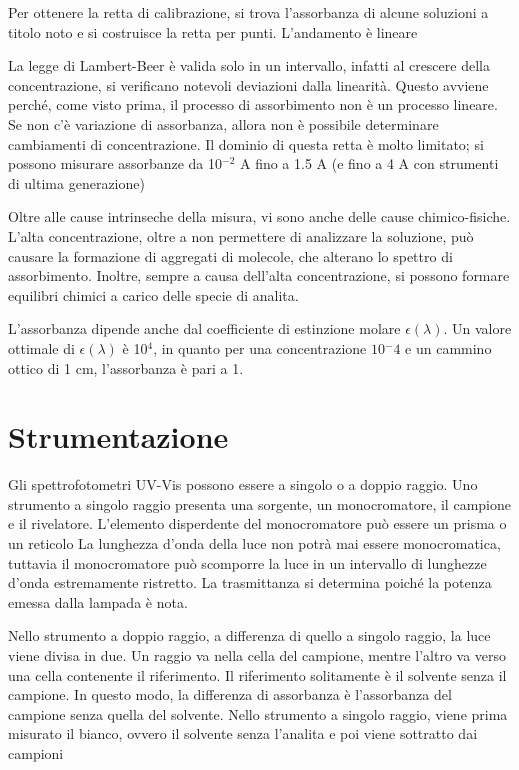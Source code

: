Per ottenere la retta di calibrazione, si trova l'assorbanza di alcune soluzioni a titolo noto e si costruisce la retta per punti. L'andamento è lineare

La legge di Lambert-Beer è valida solo in un intervallo, infatti al crescere della concentrazione, si verificano notevoli deviazioni dalla linearità.
Questo avviene perché, come visto prima, il processo di assorbimento non è un processo lineare.
Se non c'è variazione di assorbanza, allora non è possibile determinare cambiamenti di concentrazione.
Il dominio di questa retta è molto limitato; si possono misurare assorbanze da 10$^{-2}$ A fino a 1.5 A (e fino a 4 A con strumenti di ultima generazione)

Oltre alle cause intrinseche della misura, vi sono anche delle cause chimico-fisiche.
L'alta concentrazione, oltre a non permettere di analizzare la soluzione, può causare la formazione di aggregati di molecole, che alterano lo spettro di assorbimento.
Inoltre, sempre a causa dell'alta concentrazione, si possono formare equilibri chimici a carico delle specie di analita.

L'assorbanza dipende anche dal coefficiente di estinzione molare $\epsilon (\lambda)$. Un valore ottimale di $\epsilon (\lambda)$ è 10$^4$, in quanto per una concentrazione $10{^-4}$ e un cammino ottico di 1 cm, l'assorbanza è pari a 1.

\section{Strumentazione}

Gli spettrofotometri UV-Vis possono essere a singolo o a doppio raggio.
Uno strumento a singolo raggio presenta una sorgente, un monocromatore, il campione e il rivelatore. L'elemento disperdente del monocromatore può essere un prisma o un reticolo
La lunghezza d'onda della luce non potrà mai essere monocromatica, tuttavia il monocromatore può scomporre la luce in un intervallo di lunghezze d'onda estremamente ristretto.
La trasmittanza si determina poiché la potenza emessa dalla lampada è nota.


Nello strumento a doppio raggio, a differenza di quello a singolo raggio, la luce viene divisa in due. Un raggio va nella cella del campione, mentre l'altro va verso una cella contenente il riferimento.
Il riferimento solitamente è il solvente senza il campione. In questo modo, la differenza di assorbanza è l'assorbanza del campione senza quella del solvente.
Nello strumento a singolo raggio, viene prima misurato il bianco, ovvero il solvente senza l'analita e poi viene sottratto dai campioni

